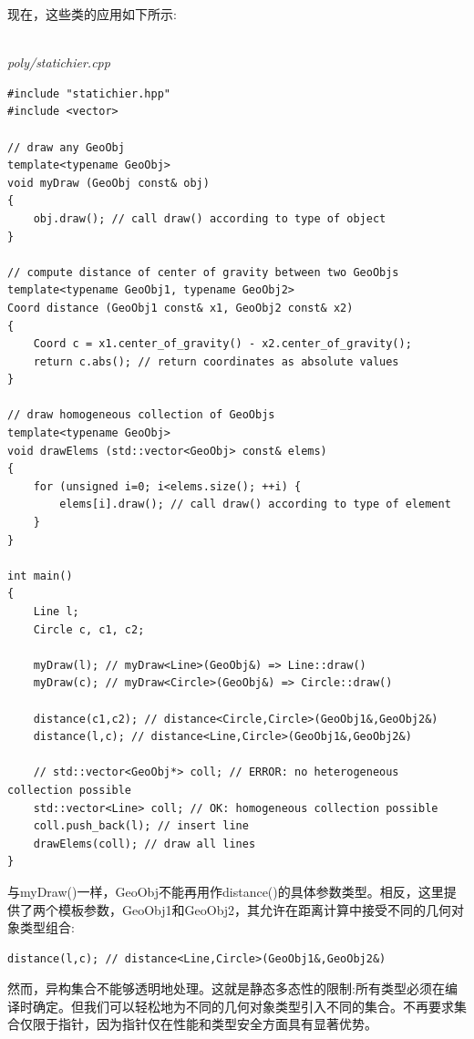 现在，这些类的应用如下所示:

\hspace*{\fill} \\ %
\noindent
\textit{poly/statichier.cpp}
\begin{lstlisting}[style=styleCXX]
#include "statichier.hpp"
#include <vector>

// draw any GeoObj
template<typename GeoObj>
void myDraw (GeoObj const& obj)
{
	obj.draw(); // call draw() according to type of object
}

// compute distance of center of gravity between two GeoObjs
template<typename GeoObj1, typename GeoObj2>
Coord distance (GeoObj1 const& x1, GeoObj2 const& x2)
{
	Coord c = x1.center_of_gravity() - x2.center_of_gravity();
	return c.abs(); // return coordinates as absolute values
}

// draw homogeneous collection of GeoObjs
template<typename GeoObj>
void drawElems (std::vector<GeoObj> const& elems)
{
	for (unsigned i=0; i<elems.size(); ++i) {
		elems[i].draw(); // call draw() according to type of element
	}
}

int main()
{
	Line l;
	Circle c, c1, c2;
	
	myDraw(l); // myDraw<Line>(GeoObj&) => Line::draw()
	myDraw(c); // myDraw<Circle>(GeoObj&) => Circle::draw()
	
	distance(c1,c2); // distance<Circle,Circle>(GeoObj1&,GeoObj2&)
	distance(l,c); // distance<Line,Circle>(GeoObj1&,GeoObj2&)
	
	// std::vector<GeoObj*> coll; // ERROR: no heterogeneous collection possible
	std::vector<Line> coll; // OK: homogeneous collection possible
	coll.push_back(l); // insert line
	drawElems(coll); // draw all lines
}
\end{lstlisting}

与myDraw()一样，GeoObj不能再用作distance()的具体参数类型。相反，这里提供了两个模板参数，GeoObj1和GeoObj2，其允许在距离计算中接受不同的几何对象类型组合:

\begin{lstlisting}[style=styleCXX]
distance(l,c); // distance<Line,Circle>(GeoObj1&,GeoObj2&)
\end{lstlisting}

然而，异构集合不能够透明地处理。这就是静态多态性的限制:所有类型必须在编译时确定。但我们可以轻松地为不同的几何对象类型引入不同的集合。不再要求集合仅限于指针，因为指针仅在性能和类型安全方面具有显著优势。


















